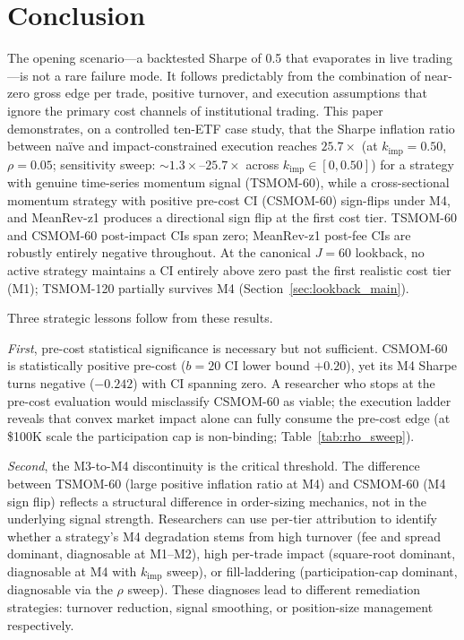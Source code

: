 \documentclass[12pt]{article}
\newcommand{\kimp}{k_{\mathrm{imp}}}
\begin{document}
\section{Conclusion}
\label{sec:conclusion}

The opening scenario---a backtested Sharpe of 0.5 that evaporates in
live trading---is not a rare failure mode. It follows predictably from
the combination of near-zero gross edge per trade, positive turnover,
and execution assumptions that ignore the primary cost channels of
institutional trading. This paper demonstrates, on a controlled
ten-ETF case study, that the Sharpe inflation ratio between na\"{i}ve
and impact-constrained execution reaches $25.7\times$ (at $\kimp=0.50$,
$\rho=0.05$; sensitivity sweep: $\sim$$1.3\times$--$25.7\times$ across
$\kimp \in [0, 0.50]$) for a strategy with genuine time-series momentum
signal (TSMOM-60), while a
cross-sectional momentum strategy with positive pre-cost CI (CSMOM-60)
sign-flips under M4, and MeanRev-z1 produces a directional sign flip
at the first cost tier.
TSMOM-60 and CSMOM-60 post-impact CIs span zero; MeanRev-z1
post-fee CIs are robustly entirely negative throughout. At the
canonical $J=60$ lookback, no active strategy maintains a CI entirely
above zero past the first realistic cost tier (M1); TSMOM-120
partially survives M4 (Section~\ref{sec:lookback_main}).

Three strategic lessons follow from these results.

\textit{First}, pre-cost statistical significance is necessary but not
sufficient. CSMOM-60 is statistically positive pre-cost
($b = 20$ CI lower bound $+0.20$), yet its M4 Sharpe turns negative
($-0.242$) with CI spanning zero. A researcher who stops at the
pre-cost evaluation would misclassify CSMOM-60 as viable; the execution
ladder reveals that convex market impact alone can
fully consume the pre-cost edge (at \$100K scale the participation cap
is non-binding; Table~\ref{tab:rho_sweep}).

\textit{Second}, the M3-to-M4 discontinuity is the critical threshold.
The difference between TSMOM-60 (large positive inflation ratio at M4)
and CSMOM-60 (M4 sign flip) reflects a structural difference in order-sizing mechanics, not
in the underlying signal strength. Researchers can use per-tier attribution
to identify whether a strategy's M4 degradation stems from high turnover
(fee and spread dominant, diagnosable at M1--M2), high per-trade impact
(square-root dominant, diagnosable at M4 with $\kimp$ sweep), or
fill-laddering (participation-cap dominant, diagnosable via the
$\rho$ sweep). These diagnoses lead to different remediation strategies:
turnover reduction, signal smoothing, or position-size management
respectively.
\end{document}
